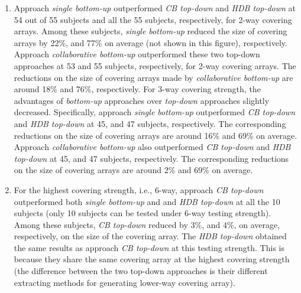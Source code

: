 \documentclass[conference]{IEEEtran}
\theoremstyle{definition}
\begin{document}
 \begin{enumerate}
 \item Approach \emph{single bottom-up} outperformed \emph{CB top-down} and \emph{HDB top-down} at 54 out of 55 subjects and all the 55 subjects, respectively, for 2-way covering arrays. Among these subjects, \emph{single bottom-up} reduced the size of covering arrays by 22\%, and 77\% on average (not shown in this figure), respectively. Approach \emph{collaborative bottom-up} outperformed these two top-down approaches at 53 and 55 subjects, respectively, for 2-way covering arrays. The reductions on the size of covering arrays made by \emph{collaborative bottom-up} are around 18\% and 76\%, respectively. For 3-way covering strength, the advantages of \emph{bottom-up} approaches over \emph{top-down} approaches slightly decreased. Specifically, approach \emph{single bottom-up}  outperformed \emph{CB top-down} and \emph{HDB top-down} at 45, and 47 subjects, respectively. The corresponding reductions on the size of covering arrays are around 16\% and 69\% on average.  Approach \emph{collaborative bottom-up} also outperformed \emph{CB top-down} and \emph{HDB top-down} at 45, and 47 subjects, respectively. The corresponding reductions on the size of covering arrays are around 2\% and 69\% on average.

 \item  For the highest covering strength, i.e., 6-way, approach \emph{CB top-down} outperformed both \emph{single bottom-up} and  and \emph{HDB top-down} at all the 10 subjects (only 10 subjects can be tested under 6-way testing strength).  Among these subjects, \emph{CB top-down} reduced by 3\%, and 4\%, on average, respectively, on the size of the covering array.
     The \emph{HDB top-down} obtained the same results as  approach \emph{CB top-down} at this testing strength. This is because they share the same covering array at the highest covering strength (the difference between the two top-down approaches is their different extracting methods for generating lower-way covering array).


\end{enumerate}
\end{document}
